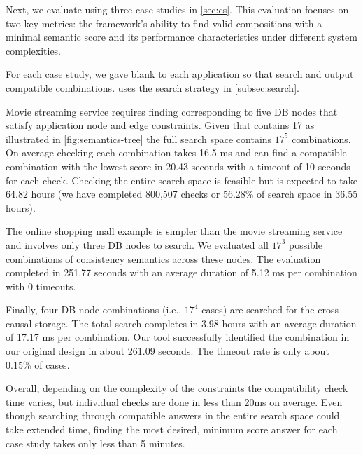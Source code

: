  Next, we evaluate \sysname{} using
three case studies in \cref{sec:cs}.
This evaluation focuses on two key metrics: the framework's ability to
find valid compositions with a minimal semantic score and its
performance characteristics under different system complexities.

For each case study, we gave blank \sysmods{} to each application
so that \sysname{} search and output compatible \sysmod{} combinations.
\sysname{} uses the search strategy in \cref{subsec:search}.

Movie streaming service requires finding \sysmods{} corresponding to
five DB nodes that satisfy application node and edge constraints.
Given that \sysname{} contains 17 \sysmods{} as illustrated in
\cref{fig:semantics-tree} the full search space contains
$17^5$ combinations. On average checking each combination
takes 16.5 ms and can find a compatible combination with the lowest
score in 20.43 seconds with a timeout of 10 seconds for each check.
Checking the entire search space is feasible but is expected to take
64.82 hours (we have completed 800,507 checks or 56.28\% of search space
in 36.55 hours).

The online shopping mall example is simpler than the movie streaming service
and involves only three DB nodes to search.
We evaluated all $17^3$ possible combinations of consistency semantics across
these nodes. The evaluation completed in 251.77 seconds with an average
duration of 5.12 ms per combination with 0 timeouts.

Finally, four DB node combinations (i.e., $17^4$ cases) are searched for
the cross causal storage. The total search completes in 3.98 hours
with an average duration of 17.17 ms per combination.
Our tool successfully identified the combination in our original design
in about 261.09 seconds. The timeout rate is only about 0.15\% of cases.

Overall, depending on the complexity of the constraints the
compatibility check time
varies, but individual checks are done in less than 20ms on average. Even though
searching through compatible answers in the entire search space could
take extended
time, finding the most desired, minimum score answer for each case
study takes only less than 5 minutes.

\vspace{-0.125cm}
